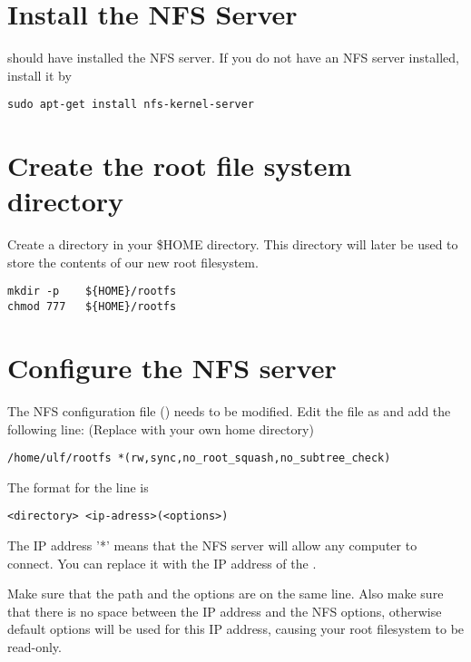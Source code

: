 
\section{Install the NFS Server}

 should have installed the NFS server.
If you do not have an NFS server installed, install it by

\begin{verbatim}
sudo apt-get install nfs-kernel-server
\end{verbatim}

\section{Create the root file system directory}

Create a  directory in your \$HOME directory. This
directory will later be used to store the contents of our new
root filesystem.

\begin{verbatim}
mkdir -p	${HOME}/rootfs
chmod 777	${HOME}/rootfs
\end{verbatim}

\section{Configure the NFS server}

The NFS configuration file () needs to be modified.
Edit the file as  and add the following line: (Replace  with your own home directory)

\begin{verbatim}
/home/ulf/rootfs *(rw,sync,no_root_squash,no_subtree_check)
\end{verbatim}

The format for the line is 
\begin{verbatim}
<directory> <ip-adress>(<options>)
\end{verbatim}

The IP address '*' means that the NFS server will allow any computer to connect.
You can replace it with the IP address of the \devboard.

Make sure that the path and the options are on the same line.
Also make sure that there is no space between the IP address and the NFS
options, otherwise default options will be used for this IP address,
causing your root filesystem to be read-only.

